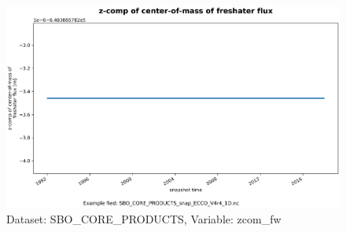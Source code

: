 \begin{figure}[H]
\centering
\includegraphics[scale=0.55]{../images/plots/oneD_plots/SBO_Core_Products/zcom_fw.png}
\caption{Dataset: SBO\_CORE\_PRODUCTS, Variable: zcom\_fw}
\label{tab:table-SBO_CORE_PRODUCTS_zcom_fw-Plot}
\end{figure}
\pagebreak
